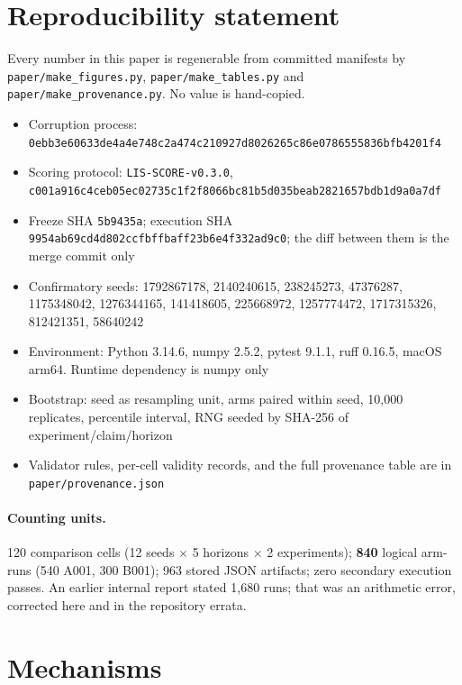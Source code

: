\documentclass[11pt]{article}
\newcommand{\code}[1]{\texttt{\small #1}}
\begin{document}
\section{Reproducibility statement}
\label{sec:repro}

Every number in this paper is regenerable from committed manifests by
\code{paper/make\_figures.py}, \code{paper/make\_tables.py} and
\code{paper/make\_provenance.py}. No value is hand-copied.

\begin{itemize}\itemsep1pt
\item Corruption process: \code{0ebb3e60633de4a4e748c2a474c210927d8026265c86e0786555836bfb4201f4}
\item Scoring protocol: \code{LIS-SCORE-v0.3.0},
      \code{c001a916c4ceb05ec02735c1f2f8066bc81b5d035beab2821657bdb1d9a0a7df}
\item Freeze SHA \code{5b9435a}; execution SHA
      \code{9954ab69cd4d802ccfbffbaff23b6e4f332ad9c0}; the diff between them is
      the merge commit only
\item Confirmatory seeds: 1792867178, 2140240615, 238245273, 47376287,
      1175348042, 1276344165, 141418605, 225668972, 1257774472, 1717315326,
      812421351, 58640242
\item Environment: Python 3.14.6, numpy 2.5.2, pytest 9.1.1, ruff 0.16.5,
      macOS arm64. Runtime dependency is numpy only
\item Bootstrap: seed as resampling unit, arms paired within seed, 10{,}000
      replicates, percentile interval, RNG seeded by SHA-256 of
      experiment/claim/horizon
\item Validator rules, per-cell validity records, and the full provenance table
      are in \code{paper/provenance.json}
\end{itemize}

\paragraph{Counting units.} 120 comparison cells (12 seeds $\times$ 5 horizons
$\times$ 2 experiments); \textbf{840} logical arm-runs (540 A001, 300 B001); 963
stored JSON artifacts; zero secondary execution passes. An earlier internal
report stated 1{,}680 runs; that was an arithmetic error, corrected here and in
the repository errata.

\appendix
\section{Mechanisms}
\begin{table}[h]\centering\small

\caption{The nine A001 maintenance policies.}
\end{table}
\end{document}
